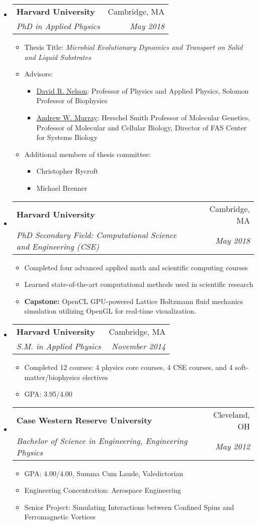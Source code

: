 \documentclass[letterpaper,11pt]{article}
\makeatletter
\newcommand{\resitem}[1]{\item #1 \vspace{-2pt}}
\newcommand{\ressubheading}[4]{\vspace{-14pt}
\begin{tabular*}{7.0in}{l@{\extracolsep{\fill}}r}
                \\
                \textbf{#1} & #2 \\
                \textit{#3} & \textit{#4} \\
\end{tabular*}\vspace{-6pt}}
\makeatother
\begin{document}
\begin{itemize}
\item
\ressubheading{Harvard University}{Cambridge, MA}{PhD in Applied Physics}{May 2018}     

\begin{itemize}
\resitem{Thesis Title: \textit{Microbial Evolutionary Dynamics and Transport on Solid and Liquid Substrates}}
\resitem{Advisors:}
\begin{itemize}
\resitem{\href{http://www.seas.harvard.edu/directory/nelson}{David R. Nelson}: Professor of Physics and Applied Physics, Solomon Professor of Biophysics}
\resitem{\href{https://www.mcb.harvard.edu/mcb/faculty/profile/andrew-w-murray/}{Andrew W. Murray}: Herschel Smith Professor of Molecular Genetics,
Professor of Molecular and Cellular Biology,
Director of FAS Center for Systems Biology}
\end{itemize}

\resitem{Additional members of thesis committee:}
\begin{itemize}
\resitem{Christopher Rycroft}
\resitem{Michael Brenner}
\end{itemize}

\end{itemize}

\item \ressubheading{Harvard University}{Cambridge, MA}{PhD Secondary Field: Computational Science and Engineering (CSE)}{May 2018}           

\begin{itemize}
\resitem{Completed four advanced applied math and scientific computing courses}
\resitem{Learned state-of-the-art computational methods used in scientific research}
\resitem{\textbf{Capstone:} OpenCL GPU-powered Lattice Boltzmann fluid mechanics simulation utilizing OpenGL for real-time visualization.  }
\end{itemize}                   

\item \ressubheading{Harvard University}{Cambridge, MA}{S.M. in Applied Physics}{November 2014}           

\begin{itemize}
\resitem{Completed 12 courses: 4 physics core courses, 4 CSE courses, and 4 soft-matter/biophysics electives}
\resitem{GPA: 3.95/4.00}
\end{itemize}

\item \ressubheading{Case Western Reserve University}{Cleveland, OH}{Bachelor of Science in Engineering, Engineering Physics}{May 2012}
\begin{itemize}
\resitem{GPA: 4.00/4.00, Summa Cum Laude, Valedictorian}
\resitem{Engineering Concentration: Aerospace Engineering}
\resitem{Senior Project: Simulating Interactions between Confined Spins and Ferromagnetic Vortices}
\end{itemize}


\end{itemize}
\end{document}
